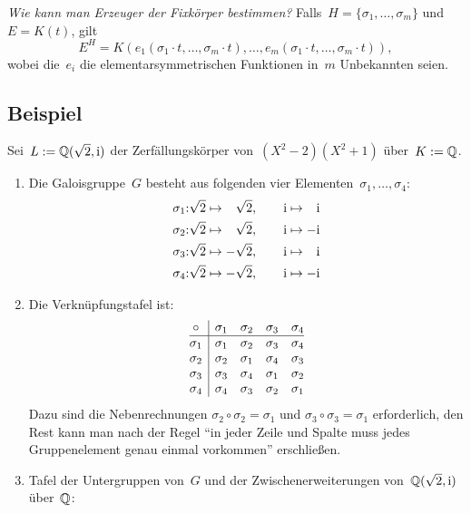 \documentclass{../../algblatt}
\begin{document}
\emph{Wie kann man Erzeuger der Fixkörper bestimmen?}
Falls~$H = \{ \sigma_1,\ldots,\sigma_m \}$ und~$E = K(t)$, gilt
\[ E^H = K(
  e_1(\sigma_1 \cdot t, \ldots, \sigma_m \cdot t),
  \ldots,
  e_m(\sigma_1 \cdot t, \ldots, \sigma_m \cdot t)), \]
wobei die~$e_i$ die elementarsymmetrischen Funktionen in~$m$ Unbekannten seien.

\subsection*{Beispiel}

Sei~$L := \QQ(\sqrt{2}, \i)$ der Zerfällungskörper von~$(X^2 - 2) (X^2 + 1)$
über~$K := \QQ$.
\begin{enumerate}
\item Die Galoisgruppe~$G$ besteht aus folgenden vier
Elementen~$\sigma_1,\ldots,\sigma_4$:
\begin{align*}
  \sigma_1{:} & \sqrt{2} \mapsto \phantom{+}\sqrt{2}, \qquad \i \mapsto \phantom{+}\i \\
  \sigma_2{:} & \sqrt{2} \mapsto \phantom{+}\sqrt{2}, \qquad \i \mapsto         {-}\i \\
  \sigma_3{:} & \sqrt{2} \mapsto         {-}\sqrt{2}, \qquad \i \mapsto \phantom{+}\i \\
  \sigma_4{:} & \sqrt{2} \mapsto         {-}\sqrt{2}, \qquad \i \mapsto         {-}\i \\
\end{align*}
\item Die Verknüpfungstafel ist:
\[ \begin{array}{@{}c|cccc@{}}
  \circ & \sigma_1 & \sigma_2 & \sigma_3 & \sigma_4 \\\hline
  \sigma_1 & \sigma_1 & \sigma_2 & \sigma_3 & \sigma_4 \\
  \sigma_2 & \sigma_2 & \sigma_1 & \sigma_4 & \sigma_3 \\
  \sigma_3 & \sigma_3 & \sigma_4 & \sigma_1 & \sigma_2 \\
  \sigma_4 & \sigma_4 & \sigma_3 & \sigma_2 & \sigma_1
\end{array} \]
Dazu sind die Nebenrechnungen $\sigma_2 \circ \sigma_2 = \sigma_1$ und
$\sigma_3 \circ \sigma_3 = \sigma_1$ erforderlich, den Rest kann man nach der
Regel "`in jeder Zeile und Spalte muss jedes Gruppenelement genau einmal
vorkommen"' erschließen.
\item Tafel der Untergruppen von~$G$ und der Zwischenerweiterungen von~$\QQ(\sqrt{2},\i)$ über~$\QQ$:
\begin{center}\begin{tikzpicture}[node distance=2cm]

\end{tikzpicture}
\end{center}
\end{enumerate}
\end{document}
